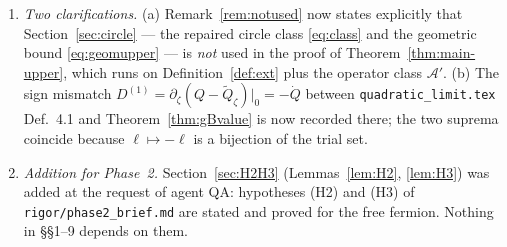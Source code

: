 \documentclass[11pt]{article}
\newcommand{\Pp}{P_+}\newcommand{\Pm}{P_-}
\newcommand{\Wt}{\widetilde W}\newcommand{\kt}{\widetilde k}
\newcommand{\Gm}{\Gamma}
\newcommand{\norm}[1]{\left\lVert #1\right\rVert}\newcommand{\abs}[1]{\left|#1\right|}
\newcommand{\ip}[2]{\left\langle #1,#2\right\rangle}\newcommand{\one}{\mathbf 1}
\begin{document}
\begin{enumerate}[label=(R\arabic*),leftmargin=3em]
 $-i\,\Pm D\Pp$ (Hilbert--Schmidt by \eqref{eq:PDP}), which restores $Ea=a$,
 $\norm a=\norm{\Pm D\Pp}_2$ and $\ip\Om a=0$; the choice of phase $\Gm(\Wt_s)=e^{s\dd\Gm(D)}$ has
 been dropped (nothing used it).  Equation \eqref{eq:phi} is now asserted and proved only for
 quasi-free $K=\dd\Gm(\ell)$, by the two-line $\Stwo$ computation
 $\Tr(\dot Q\ell)=-\Tr(G^{(1)}\ell)=-2\operatorname{Re}\ip{\Pm D\Pp}{\Pm\ell\Pp}
 =-2\operatorname{Im}\ip a{\dd\Gm(\ell)\Om}$, which is the only case used
 (Proposition~\ref{prop:infimum} $\langle1\rangle6$); Theorem~\ref{thm:three-faces} takes $\varphi$
 as defined by $a$ and requires no differentiation.  See Remark~\ref{rem:normalorder}.
\item \emph{Two clarifications.}  (a) Remark~\ref{rem:notused} now states explicitly that
 Section~\ref{sec:circle} --- the repaired circle class \eqref{eq:class} and the geometric bound
 \eqref{eq:geomupper} --- is \emph{not} used in the proof of Theorem~\ref{thm:main-upper}, which
 runs on Definition~\ref{def:ext} plus the operator class $\mathcal A'$.  (b) The sign mismatch
 $D^{(1)}=\partial_\zeta(Q-\widetilde Q_\zeta)|_0=-\dot Q$ between
 \texttt{quadratic\_limit.tex} Def.~4.1 and Theorem~\ref{thm:gBvalue} is now recorded there; the two
 suprema coincide because $\ell\mapsto-\ell$ is a bijection of the trial set.
\item \emph{Addition for Phase~2.}  Section~\ref{sec:H2H3} (Lemmas~\ref{lem:H2}, \ref{lem:H3}) was
 added at the request of agent QA: hypotheses (H2) and (H3) of \texttt{rigor/phase2\_brief.md} are
 stated and proved for the free fermion.  Nothing in \S\S1--9 depends on them.
\end{enumerate}
\end{document}
